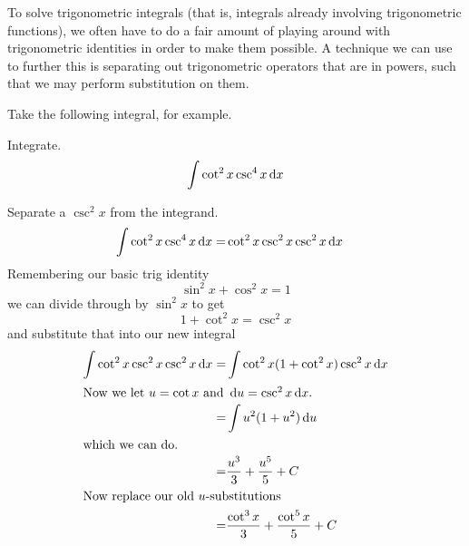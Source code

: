 To solve trigonometric integrals (that is, integrals already involving trigonometric functions),
we often have to do a fair amount of playing around with trigonometric identities in order to make them possible.
A technique we can use to further this is separating out trigonometric operators that are in powers, such that we may perform substitution on them.

Take the following integral, for example.
\begin{ex}
  Integrate.
  \[\int \cot^2x \csc^4x \,\mathrm{d} x \]
  \begin{sol}
    Separate a $\csc^2x$ from the integrand.
    \begin{align*}
      \int \cot^2x \csc^4x \,\mathrm{d} x
      =& \cot^2x \csc^2x \csc^2x \,\mathrm{d} x
    \end{align*}
    Remembering our basic trig identity
    \[ \sin^2x + \cos^2x = 1\]
    we can divide through by $\sin^2x$ to get
    \[ 1+\cot^2x=\csc^2x \]
    and substitute that into our new integral
    \begin{align*}
      \int\cot^2x\csc^2x\csc^2x\,\mathrm{d} x
      =& \int \cot^2x (1+\cot^2x)\csc^2x \,\mathrm{d} x \\
      \intertext{Now we let $u=\cot x$ and $\,\mathrm{d} u=\csc^2x \,\mathrm{d} x$.}
      =&\int u^2(1+u^2)\,\mathrm{d} u \\
      \intertext{which we can do.}
      =& \frac{u^3}{3}+\frac{u^5}{5}+C \\
      \intertext{Now replace our old $u$-substitutions}
      =& \frac{\cot^3x}{3}+\frac{\cot^5x}{5}+C
    \end{align*}
  \end{sol}
\end{ex}



